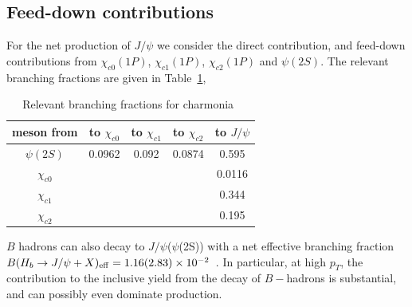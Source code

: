 \documentclass[aps,prc,preprint,superscriptaddress,showpacs,showkeys,amsmath]{revtex4-1}
\begin{document}
\subsection{Feed-down contributions}

For the net production of $J/\psi$ we consider the direct contribution, and
feed-down contributions from $\chi_{c0}(1P)$, $\chi_{c1}(1P)$,
$\chi_{c2}(1P)$ and $\psi(2S)$. The relevant branching fractions are given
in Table~\ref{table:CharmoniaBFs},

\begin{table}[h]
\begin{tabular}{c|cccc}
meson from &to $\chi_{c0}$ &to $\chi_{c1}$ &to $\chi_{c2}$ &to $J/\psi$\\ 
\hline
$\psi(2S)$ & 0.0962 & 0.092 & 0.0874 & 0.595   \\
$\chi_{c0}$& &  &  & 0.0116           \\
$\chi_{c1}$& &  &  & 0.344           \\
$\chi_{c2}$& &  &  & 0.195           \\
\end{tabular}
\caption{Relevant branching fractions for charmonia~\cite{Nakamura:2010zzi}}
\label{table:CharmoniaBFs}
\end{table}

$B$ hadrons can also decay to $J/\psi$($\psi$(2S)) with a net effective branching fraction
$B(H_b\rightarrow J/\psi+X)_{\rm {eff}} =1.16(2.83)\times10^{-2}$~\cite{Acosta:2004yw}. 
In particular, at high $p_T$, the contribution to the inclusive yield from the decay of $B-$hadrons is
substantial, and can possibly even dominate production.


\end{document}
